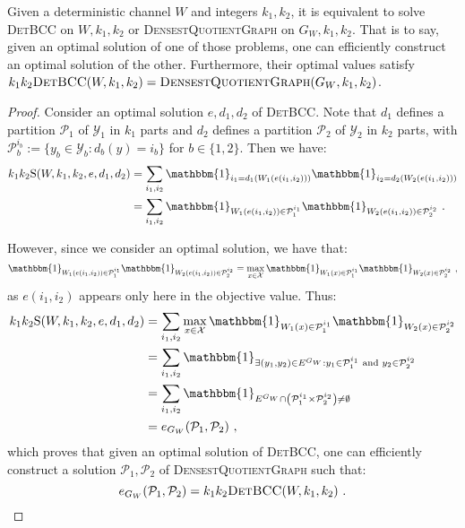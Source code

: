\begin{proposition}
  \label{prop:BCCisDQG}
  Given a deterministic channel $W$ and integers $k_1,k_2$, it is equivalent to solve \textsc{DetBCC} on $W,k_1,k_2$ or \textsc{DensestQuotientGraph} on $G_W,k_1,k_2$. That is to say, given an optimal solution of one of those problems, one can efficiently construct an optimal solution of the other. Furthermore, their optimal values satisfy $k_1k_2\textsc{DetBCC}(W,k_1,k_2) = \textsc{DensestQuotientGraph}(G_W,k_1,k_2)$.
\end{proposition}
\begin{proof}
 Consider an optimal solution $e,d_1,d_2$ of \textsc{DetBCC}. Note that $d_1$ defines a partition $\mathcal{P}_1$ of $\mathcal{Y}_1$ in $k_1$ parts and $d_2$ defines a partition $\mathcal{P}_2$ of $\mathcal{Y}_2$ in $k_2$ parts, with $\mathcal{P}_b^{i_b} := \{y_b \in \mathcal{Y}_b : d_b(y) = i_b \}$ for $b \in \{1,2\}$. Then we have:
\begin{equation}
  \begin{aligned}
    k_1k_2\mathrm{S}(W,k_1,k_2,e,d_1,d_2) &= \sum_{i_1,i_2} \mathbbm{1}_{i_1=d_1(W_1(e(i_1,i_2)))}\mathbbm{1}_{i_2=d_2(W_2(e(i_1,i_2)))}\\
    &= \sum_{i_1,i_2} \mathbbm{1}_{W_1(e(i_1,i_2)) \in \mathcal{P}_1^{i_1}}\mathbbm{1}_{W_2(e(i_1,i_2)) \in \mathcal{P}_2^{i_2}} \ .
    \end{aligned}
\end{equation}

However, since we consider an optimal solution, we have that:
\[ \mathbbm{1}_{W_1(e(i_1,i_2)) \in \mathcal{P}_1^{i_1}}\mathbbm{1}_{W_2(e(i_1,i_2)) \in \mathcal{P}_2^{i_2}} = \max_{x \in \mathcal{X}}\mathbbm{1}_{W_1(x) \in \mathcal{P}_1^{i_1}}\mathbbm{1}_{W_2(x) \in \mathcal{P}_2^{i_2}} \ , \]
as $e(i_1,i_2)$ appears only here in the objective value. Thus:
\begin{equation}
  \begin{aligned}   
    k_1k_2\mathrm{S}(W,k_1,k_2,e,d_1,d_2) &=  \sum_{i_1,i_2} \max_{x \in \mathcal{X}}\mathbbm{1}_{W_1(x) \in \mathcal{P}_1^{i_1}}\mathbbm{1}_{W_2(x) \in \mathcal{P}_2^{i_2}}\\
    &= \sum_{i_1,i_2} \mathbbm{1}_{\exists (y_1,y_2) \in E^{G_W}: y_1 \in \mathcal{P}_1^{i_1}\text{ and } y_2 \in \mathcal{P}_2^{i_2}}\\
    &= \sum_{i_1,i_2} \mathbbm{1}_{E^{G_W} \cap \left(\mathcal{P}_1^{i_1} \times \mathcal{P}_2^{i_2}\right) \not= \emptyset}\\
    &=  e_{G_W}(\mathcal{P}_1,\mathcal{P}_2) \ ,\\
    \end{aligned}
\end{equation}
which proves that given an optimal solution of \textsc{DetBCC}, one can efficiently construct a solution $\mathcal{P}_1,\mathcal{P}_2$ of \textsc{DensestQuotientGraph} such that:
\[ e_{G_W}(\mathcal{P}_1,\mathcal{P}_2) =  k_1k_2\textsc{DetBCC}(W,k_1,k_2) \ . \]


\end{proof}
